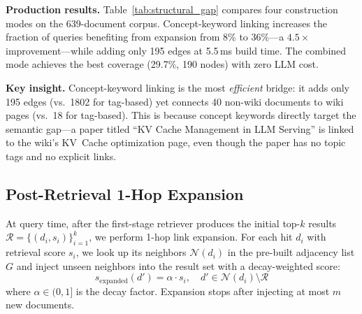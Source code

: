 \documentclass[sigconf,review]{acmart}
\begin{document}
\textbf{Production results.}
Table~\ref{tab:structural_gap} compares four construction modes on the
639-document corpus.  Concept-keyword linking increases the fraction of
queries benefiting from expansion from 8\% to 36\%---a $4.5\times$
improvement---while adding only 195 edges at 5.5\,ms build time.
The combined mode achieves the best coverage (29.7\%, 190 nodes)
with zero LLM cost.

\begin{table}[t]
\caption{Structural gap ablation on a 639-document heterogeneous KB
(19 wiki + 620 non-wiki).}
\label{tab:structural_gap}
\centering
\small
{}
\end{table}

\textbf{Key insight.}
Concept-keyword linking is the most \emph{efficient} bridge: it adds
only 195 edges (vs.\ 1802 for tag-based) yet connects 40 non-wiki
documents to wiki pages (vs.\ 18 for tag-based).  This is because
concept keywords directly target the semantic gap---a paper titled
``KV Cache Management in LLM Serving'' is linked to the wiki's
KV~Cache optimization page, even though the paper has no topic tags
and no explicit links.

\subsection{Post-Retrieval 1-Hop Expansion}
\label{sec:expansion}

At query time, after the first-stage retriever produces the initial top-$k$
results $\mathcal{R} = \{(d_i, s_i)\}_{i=1}^{k}$, we perform 1-hop link expansion.
For each hit $d_i$ with retrieval score $s_i$, we look up its neighbors
$\mathcal{N}(d_i)$ in the pre-built adjacency list $G$ and inject unseen
neighbors into the result set with a decay-weighted score:
\[
  s_{\text{expanded}}(d') = \alpha \cdot s_i, \quad d' \in \mathcal{N}(d_i) \setminus \mathcal{R}
\]
where $\alpha \in (0, 1]$ is the decay factor.  Expansion stops after
injecting at most $m$ new documents.
\end{document}
